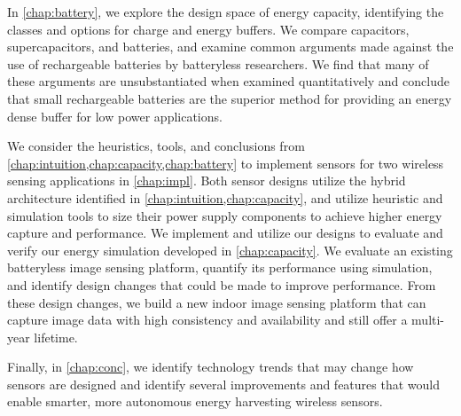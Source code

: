In \cref{chap:battery}, we explore the design space of energy capacity, identifying the classes and options for charge and energy buffers. We compare capacitors, supercapacitors, and batteries, and examine common arguments made against the use of rechargeable batteries by batteryless researchers.
We find that many of these arguments are unsubstantiated when examined quantitatively and conclude that small rechargeable batteries are the superior method for providing an energy dense buffer for low power applications.

We consider the heuristics, tools, and conclusions from \cref{chap:intuition,chap:capacity,chap:battery} to implement sensors for two wireless sensing applications in \cref{chap:impl}. Both sensor designs utilize the hybrid architecture identified in \cref{chap:intuition,chap:capacity}, and utilize heuristic and simulation tools to size their power supply components to achieve higher energy capture and performance. 
We implement and utilize our designs to evaluate and verify our energy simulation developed in \cref{chap:capacity}. 
We evaluate an existing batteryless image sensing platform, quantify its performance using simulation, and identify design changes that could be made to improve performance.
From these design changes, we build a new indoor image sensing platform that can capture image data with high consistency and availability and still offer a multi-year lifetime. 

Finally, in \cref{chap:conc}, we identify technology trends that may change how sensors are designed and identify several improvements and features that would enable smarter, more autonomous energy harvesting wireless sensors. 

